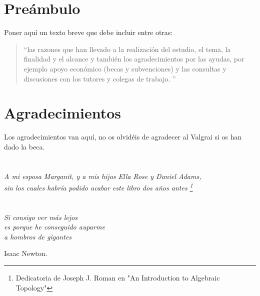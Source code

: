 
\chapter*{Preámbulo}
\thispagestyle{empty}
Poner aquí un texto breve que debe incluir entre otras:
\begin{quote}
``las razones que han llevado a la realización del estudio, el tema, la finalidad y el alcance y también los agradecimientos por las ayudas, por ejemplo apoyo económico (becas y subvenciones) y las consultas y discusiones con los tutores y colegas de trabajo. \citep{UNE50136:97}''
\end{quote}


\cleardoublepage %
\chapter*{Agradecimientos}

\thispagestyle{empty}
\vspace{1cm}

Los agradecimientos van aquí, no os olvidéis de agradecer al Valgrai si os han dado la beca.

\cleardoublepage %
\chapter*{}
\setlength{\leftmargin}{0.5\textwidth}
\setlength{\parsep}{0cm}
\addtolength{\topsep}{0.5cm}
\begin{flushright}
\small\em{
A mi esposa Marganit, y a mis hijos Ella Rose y Daniel Adams,\\
sin los cuales habría podido acabar este libro dos años antes \footnote{Dedicatoria de Joseph J. Roman en "An Introduction to Algebraic Topology"}
}
\end{flushright}


\cleardoublepage %
\chapter*{}
\setlength{\leftmargin}{0.5\textwidth}
\setlength{\parsep}{0cm}
\addtolength{\topsep}{0.5cm}
\begin{flushright}
\small\em{
Si consigo ver más lejos\\
es porque he conseguido auparme\\ 
a hombros de gigantes
}
\end{flushright}
\begin{flushright}
\small{
Isaac Newton.
}
\end{flushright}
\cleardoublepage %
